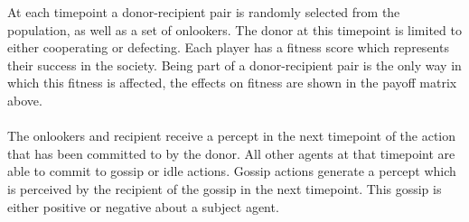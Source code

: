 \documentclass[25pt,a3paper]{tikzposter}
\begin{document}
\begin{columns}
{	At each timepoint a donor-recipient pair is randomly selected from the population, as well as a set of onlookers. The donor at this timepoint is limited to either cooperating or defecting. Each player has a fitness score which represents their success in the society. Being part of a donor-recipient pair is the only way in which  this fitness is affected, the effects on fitness are shown in the payoff matrix above.\\\\
	The onlookers and recipient receive a percept in the next timepoint of the action that has been committed to by the donor. All other agents at that timepoint are able to commit to gossip or idle actions. Gossip actions generate a percept which is perceived by the recipient of the gossip in the next timepoint. This gossip is either positive or negative about a subject agent.
}
\end{columns}
\end{document}
